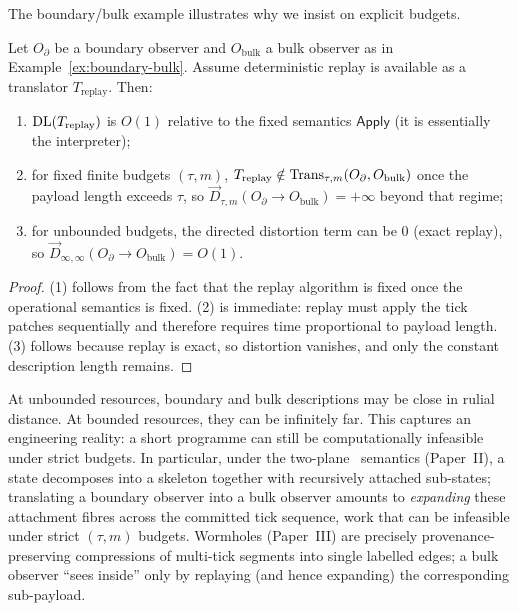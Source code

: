 \documentclass{aion}
\newcommand{\Apply}{\mathsf{Apply}}
\begin{document}
The boundary/bulk example illustrates why we insist on explicit budgets.

\begin{proposition}\label{prop:boundary-bulk}
Let $O_{\partial}$ be a boundary observer and $O_{\mathrm{bulk}}$ a bulk observer as in Example~\ref{ex:boundary-bulk}.
Assume deterministic replay is available as a translator $T_{\mathrm{replay}}$.
Then:
\begin{enumerate}[leftmargin=*]
  \item $\operatorname{DL}(T_{\mathrm{replay}})$ is $O(1)$ relative to the fixed semantics $\Apply$ (it is essentially the interpreter);
  \item for fixed finite budgets $(\tau,m)$, $T_{\mathrm{replay}}\notin\operatorname{Trans}_{\tau,m}(O_{\partial},O_{\mathrm{bulk}})$ once the payload length exceeds $\tau$,
        so $\vec{D}_{\tau,m}(O_{\partial}\!\to\!O_{\mathrm{bulk}})=+\infty$ beyond that regime;
  \item for unbounded budgets, the directed distortion term can be $0$ (exact replay), so
        $\vec{D}_{\infty,\infty}(O_{\partial}\!\to\!O_{\mathrm{bulk}})=O(1)$.
\end{enumerate}
\end{proposition}

\begin{proof}
(1) follows from the fact that the replay algorithm is fixed once the operational semantics is fixed.
(2) is immediate: replay must apply the tick patches sequentially and therefore requires time proportional to payload length.
(3) follows because replay is exact, so distortion vanishes, and only the constant description length remains.
\end{proof}

\begin{remark}[Interpretation]
At unbounded resources, boundary and bulk descriptions may be close in rulial distance.
At bounded resources, they can be infinitely far.
This captures an engineering reality: a short programme can still be computationally infeasible under strict budgets.
In particular, under the two-plane \WARP\ semantics (Paper~II), a state decomposes into a skeleton together with recursively
attached sub-states; translating a boundary observer into a bulk observer amounts to \emph{expanding} these attachment fibres
across the committed tick sequence, work that can be infeasible under strict $(\tau,m)$ budgets.
Wormholes (Paper~III) are precisely provenance-preserving compressions of multi-tick segments into single labelled edges; a bulk observer ``sees inside''
only by replaying (and hence expanding) the corresponding sub-payload.
\end{remark}
\end{document}
